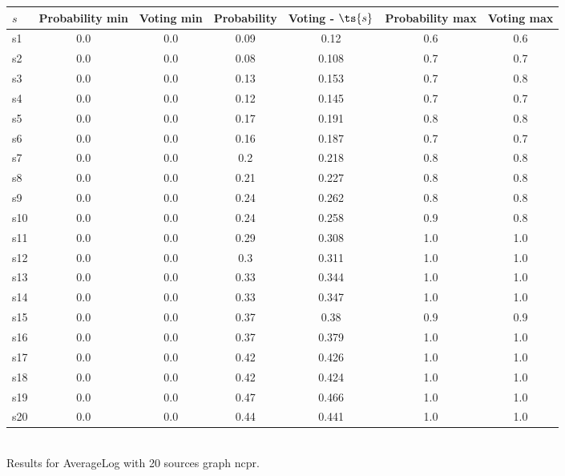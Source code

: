 \documentclass{article}
\begin{document}
\noindent\begin{tabular}{|l|c|c|c|c|c|c|}
\hline
$s$& Probability min & Voting min & Probability & Voting - $\ts{s}$ & Probability max & Voting max\\
\hline
s1 &0.0 & 0.0 & 0.09 & 0.12 & 0.6 & 0.6\\
\hline
s2 &0.0 & 0.0 & 0.08 & 0.108 & 0.7 & 0.7\\
\hline
s3 &0.0 & 0.0 & 0.13 & 0.153 & 0.7 & 0.8\\
\hline
s4 &0.0 & 0.0 & 0.12 & 0.145 & 0.7 & 0.7\\
\hline
s5 &0.0 & 0.0 & 0.17 & 0.191 & 0.8 & 0.8\\
\hline
s6 &0.0 & 0.0 & 0.16 & 0.187 & 0.7 & 0.7\\
\hline
s7 &0.0 & 0.0 & 0.2 & 0.218 & 0.8 & 0.8\\
\hline
s8 &0.0 & 0.0 & 0.21 & 0.227 & 0.8 & 0.8\\
\hline
s9 &0.0 & 0.0 & 0.24 & 0.262 & 0.8 & 0.8\\
\hline
s10 &0.0 & 0.0 & 0.24 & 0.258 & 0.9 & 0.8\\
\hline
s11 &0.0 & 0.0 & 0.29 & 0.308 & 1.0 & 1.0\\
\hline
s12 &0.0 & 0.0 & 0.3 & 0.311 & 1.0 & 1.0\\
\hline
s13 &0.0 & 0.0 & 0.33 & 0.344 & 1.0 & 1.0\\
\hline
s14 &0.0 & 0.0 & 0.33 & 0.347 & 1.0 & 1.0\\
\hline
s15 &0.0 & 0.0 & 0.37 & 0.38 & 0.9 & 0.9\\
\hline
s16 &0.0 & 0.0 & 0.37 & 0.379 & 1.0 & 1.0\\
\hline
s17 &0.0 & 0.0 & 0.42 & 0.426 & 1.0 & 1.0\\
\hline
s18 &0.0 & 0.0 & 0.42 & 0.424 & 1.0 & 1.0\\
\hline
s19 &0.0 & 0.0 & 0.47 & 0.466 & 1.0 & 1.0\\
\hline
s20 &0.0 & 0.0 & 0.44 & 0.441 & 1.0 & 1.0\\
\hline
\end{tabular}\\

\noindent Results for AverageLog with 20 sources graph ncpr.
\end{document}
